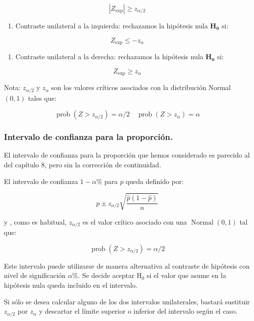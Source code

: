 \documentclass[
]{article}
\providecommand{\tightlist}{%
  \setlength{\itemsep}{0pt}\setlength{\parskip}{0pt}}
\begin{document}
\[
\left|Z_{\exp }\right| \geq z_{\alpha / 2}
\]

\begin{enumerate}
\def\labelenumi{\alph{enumi})}
\setcounter{enumi}{1}
\tightlist
\item
  Contraste unilateral a la izquierda: rechazamos la hipótesis nula \(\mathbf{H}_{\mathbf{0}}\) si:
\end{enumerate}

\[
Z_{\exp } \leq-z_{\alpha}
\]

\begin{enumerate}
\def\labelenumi{\alph{enumi})}
\setcounter{enumi}{2}
\tightlist
\item
  Contraste unilateral a la derecha: rechazamos la hipótesis nula \(\mathbf{H}_{\mathbf{0}}\) si:
\end{enumerate}

\[
Z_{\exp } \geq z_{\alpha}
\]

Nota: \(z_{\alpha / 2}\) y \(z_{\alpha}\) son los valores críticos asociados con la distribución Normal \((0,1)\) tales que:

\[
\operatorname{prob}\left(Z>z_{\alpha / 2}\right)=\alpha / 2 \quad \operatorname{prob}\left(Z>z_{\alpha}\right)=\alpha
\]

\subsubsection{Intervalo de confianza para la proporción.}\label{intervalo-de-confianza-para-la-proporciuxf3n.}

El intervalo de confianza para la proporción que hemos considerado es parecido al del capítulo 8, pero sin la corrección de continuidad.

El intervalo de confianza \(1-\alpha \%\) para \(p\) queda definido por:

\[
\hat{p} \pm z_{\alpha / 2} \sqrt{\frac{\hat{p}(1-\hat{p})}{n}}
\]

y , como es habitual, \(z_{\alpha / 2}\) es el valor crítico asociado con una \(\operatorname{Normal}(0,1)\) tal que:

\[
\operatorname{prob}\left(Z>z_{\alpha / 2}\right)=\alpha / 2
\]

Este intervalo puede utilizarse de manera alternativa al contraste de hipótesis con nivel de significación \(\alpha \%\). Se decide aceptar \(\mathrm{H}_{0}\) si el valor que asume en la hipótesis nula queda incluido en el intervalo.

Si sólo se desea calcular alguno de los dos intervalos unilaterales, bastará sustituir \(z_{\alpha / 2}\) por \(z_{\alpha}\) y descartar el límite superior o inferior del intervalo según el caso.
\end{document}
